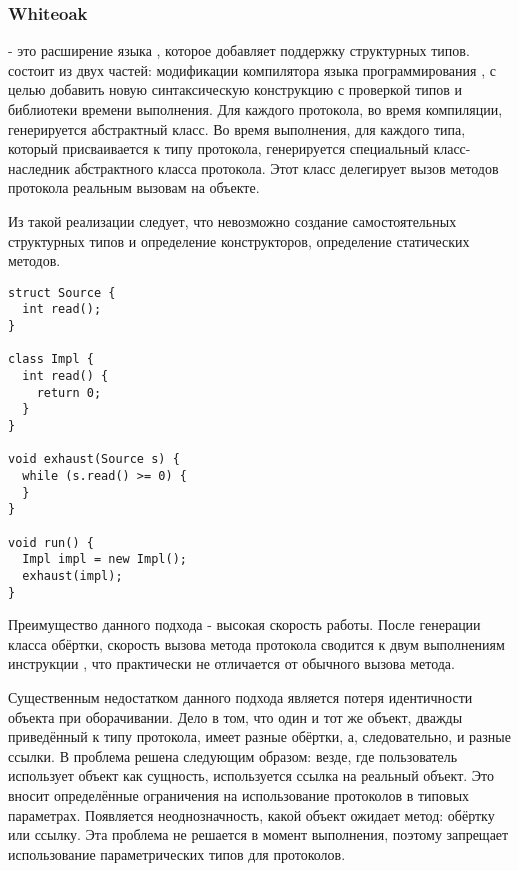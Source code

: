 \subsubsection{Whiteoak}
 - это расширение языка , которое добавляет поддержку структурных типов\cite{whiteoak}.  состоит из двух частей: модификации компилятора языка программирования , с целью добавить новую синтаксическую конструкцию с проверкой типов и библиотеки времени выполнения. Для каждого протокола, во время компиляции, генерируется абстрактный класс. Во время выполнения, для каждого типа, который присваивается к типу протокола, генерируется специальный класс-наследник абстрактного класса протокола. Этот класс делегирует вызов методов протокола реальным вызовам на объекте.

Из такой реализации следует, что невозможно создание самостоятельных структурных типов и определение конструкторов, определение статических методов.

\begin{verbatim}
struct Source {
  int read();
}

class Impl {
  int read() {
    return 0;
  }
}

void exhaust(Source s) {
  while (s.read() >= 0) {
  }
}

void run() {
  Impl impl = new Impl();
  exhaust(impl);
}

\end{verbatim}

Преимущество данного подхода - высокая скорость работы. После генерации класса обёртки, скорость вызова метода протокола сводится к двум выполнениям инструкции , что практически не отличается от обычного вызова метода.

Существенным недостатком данного подхода является потеря идентичности объекта при оборачивании. Дело в том, что один и тот же объект, дважды приведённый к типу протокола, имеет разные обёртки, а, следовательно, и разные ссылки. В  проблема решена следующим образом: везде, где пользователь использует объект как сущность, используется ссылка на реальный объект. Это вносит определённые ограничения на использование протоколов в типовых параметрах. Появляется неоднозначность, какой объект ожидает метод: обёртку или ссылку. Эта проблема не решается в момент выполнения, поэтому  запрещает использование параметрических типов для протоколов.
